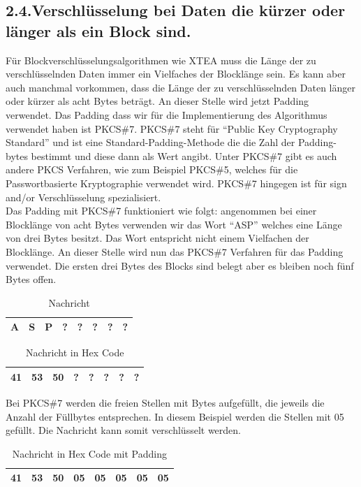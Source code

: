 \documentclass[course=asp]{aspdoc}
\begin{document}
\subsection*{2.4.Verschlüsselung bei Daten die kürzer oder länger als ein Block sind. }
Für Blockverschlüsselungsalgorithmen wie XTEA muss die Länge der zu verschlüsselnden Daten immer ein Vielfaches der Blocklänge sein. Es kann aber auch manchmal vorkommen, dass die Länge der zu verschlüsselnden Daten länger oder kürzer als acht Bytes beträgt. An dieser Stelle wird jetzt  Padding verwendet. Das Padding dass wir für die Implementierung des Algorithmus verwendet haben ist PKCS\#7. PKCS\#7 steht für “Public Key Cryptography Standard” und ist eine Standard-Padding-Methode die die Zahl der Padding-bytes bestimmt und diese dann als Wert angibt. Unter PKCS\#7 gibt es auch andere PKCS Verfahren, wie zum Beispiel PKCS\#5, welches für die Passwortbasierte Kryptographie verwendet wird. PKCS\#7 hingegen ist für sign and/or Verschlüsselung spezialisiert.~\cite{whatispkcs7}  \\
Das Padding mit PKCS\#7 funktioniert wie folgt: angenommen bei einer Blocklänge von acht Bytes verwenden wir das Wort “ASP” welches eine Länge von drei Bytes besitzt. Das Wort entspricht nicht einem Vielfachen der Blocklänge. An dieser Stelle wird nun das PKCS\#7 Verfahren für das Padding verwendet. Die ersten drei Bytes des Blocks sind belegt aber es bleiben noch fünf Bytes offen.
\begin{table}[H]
\centering
    \begin{tabular}{|l|l|l|l|l|l|l|l|}
        \hline
        A & S & P & ? & ? & ? & ? & ?    \\
        \hline
    \end{tabular}
    \caption{Nachricht}
\end{table}

\begin{table}[H]
\centering
    \begin{tabular}{|l|l|l|l|l|l|l|l|}
        \hline
        41 & 53 & 50 & ? & ? & ? & ? & ?    \\
        \hline
    \end{tabular}
    \caption{Nachricht in Hex Code}
\end{table}
Bei PKCS\#7 werden die freien Stellen mit Bytes aufgefüllt, die jeweils die Anzahl der Füllbytes entsprechen. In diesem Beispiel werden die Stellen mit 05 gefüllt.  Die Nachricht kann somit verschlüsselt werden.
\begin{table}[H]
\centering
    \begin{tabular}{|l|l|l|l|l|l|l|l|}
        \hline
        41 & 53 & 50 & 05 & 05 & 05 & 05 & 05    \\
        \hline
    \end{tabular}
    \caption{Nachricht in Hex Code mit Padding }
\end{table}
\end{document}
